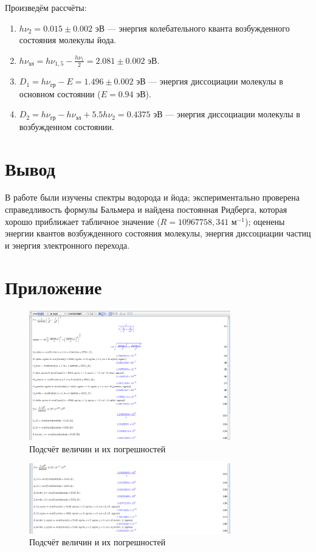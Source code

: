 \documentclass[a4paper]{article}
\begin{document}
\noindent Произведём рассчёты:
\begin{enumerate}
    \item $h\nu_2 = 0.015 \pm 0.002$ эВ --- энергия колебательного кванта возбужденного состояния молекулы йода.
    \item $h\nu_{\text{эл}} = h\nu_{1,5} - \frac{h\nu_1}{2} = 2.081 \pm 0.002$ эВ.
    \item $D_1 = h\nu_{\text{гр}} - E = 1.496 \pm 0.002$ эВ --- энергия диссоциации молекулы в основном состоянии ($E = 0.94$ эВ).
    \item $D_2 = h\nu_{\text{гр}} - h\nu_{\text{эл}} + 5.5 h\nu_2 = 0.4375$ эВ --- энергия диссоциации молекулы в возбужденном состоянии.
\end{enumerate}

\section{Вывод}
В работе были изучены спектры водорода и йода; экспериментально проверена справедливость формулы Бальмера и найдена постоянная Ридберга, которая хорошо приближает табличное значение ($R = 10 967 758,341$ м$^{-1}$); оценены энергии квантов возбужденного состояния молекулы, энергия диссоциации частиц и энергия электронного перехода.

\section{Приложение}

\begin{figure}[!ht]
    \begin{center}
        \includegraphics[width = 0.78\textwidth]{image/maple1.png}
        \caption{Подсчёт величин и их погрешностей}
    \end{center}
\end{figure}

\begin{figure}[!ht]
    \begin{center}
        \includegraphics[width = 0.78\textwidth]{image/maple2.png}
        \caption{Подсчёт величин и их погрешностей}
    \end{center}
\end{figure}
\end{document}
